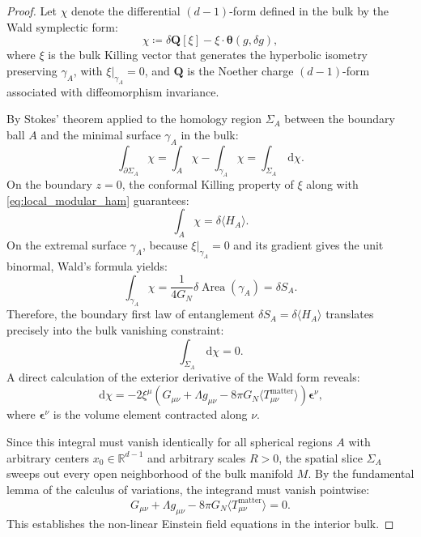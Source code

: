 \documentclass[11pt,a4paper,reqno]{amsart}
\theoremstyle{definition}
\numberwithin{equation}{section}
\newcommand{\R}{\mathbb{R}}
\newcommand{\Area}{\operatorname{Area}}
\newcommand{\dif}{\,\mathrm{d}}
\begin{document}
\begin{proof}
Let $\chi$ denote the differential $(d-1)$-form defined in the bulk by the Wald symplectic form:
\begin{equation}
    \chi \coloneqq \delta \mathbf{Q}[\xi] - \xi \cdot \mathbf{\theta}(g, \delta g),
\end{equation}
where $\xi$ is the bulk Killing vector that generates the hyperbolic isometry preserving $\gamma_A$, with $\xi|_{\gamma_A} = 0$, and $\mathbf{Q}$ is the Noether charge $(d-1)$-form associated with diffeomorphism invariance.

By Stokes' theorem applied to the homology region $\Sigma_A$ between the boundary ball $A$ and the minimal surface $\gamma_A$ in the bulk:
\begin{equation}
    \int_{\partial \Sigma_A} \chi = \int_A \chi - \int_{\gamma_A} \chi = \int_{\Sigma_A} \dif \chi.
\end{equation}
On the boundary $z = 0$, the conformal Killing property of $\xi$ along with \eqref{eq:local_modular_ham} guarantees:
\begin{equation}
    \int_A \chi = \delta \langle H_A \rangle.
\end{equation}
On the extremal surface $\gamma_A$, because $\xi|_{\gamma_A} = 0$ and its gradient gives the unit binormal, Wald's formula yields:
\begin{equation}
    \int_{\gamma_A} \chi = \frac{1}{4 G_N} \delta \Area(\gamma_A) = \delta S_A.
\end{equation}
Therefore, the boundary first law of entanglement $\delta S_A = \delta \langle H_A \rangle$ translates precisely into the bulk vanishing constraint:
\begin{equation}
    \int_{\Sigma_A} \dif \chi = 0.
\end{equation}
A direct calculation of the exterior derivative of the Wald form reveals:
\begin{equation}
    \dif \chi = -2 \xi^\mu \left( G_{\mu\nu} + \Lambda g_{\mu\nu} - 8\pi G_N \langle T_{\mu\nu}^{\mathrm{matter}} \rangle \right) \mathbf{\epsilon}^\nu,
\end{equation}
where $\mathbf{\epsilon}^\nu$ is the volume element contracted along $\nu$. 

Since this integral must vanish identically for all spherical regions $A$ with arbitrary centers $x_0 \in \R^{d-1}$ and arbitrary scales $R > 0$, the spatial slice $\Sigma_A$ sweeps out every open neighborhood of the bulk manifold $M$. By the fundamental lemma of the calculus of variations, the integrand must vanish pointwise:
\begin{equation}
    G_{\mu\nu} + \Lambda g_{\mu\nu} - 8\pi G_N \langle T_{\mu\nu}^{\mathrm{matter}} \rangle = 0.
\end{equation}
This establishes the non-linear Einstein field equations in the interior bulk.
\end{proof}
\end{document}
